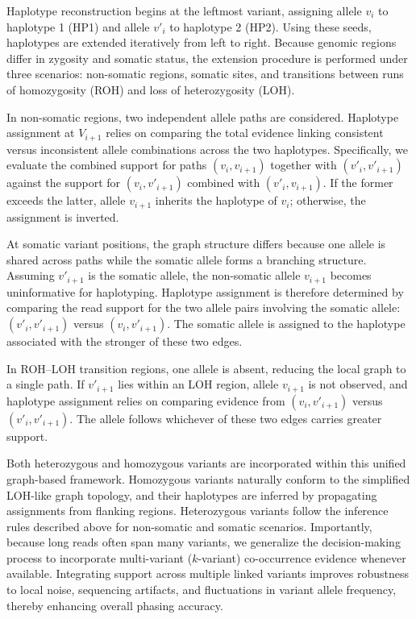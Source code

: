 \documentclass[pdflatex,sn-nature]{sn-jnl}
\begin{document}
Haplotype reconstruction begins at the leftmost variant, assigning allele \(v_i\) to haplotype 1 (HP1) and allele \(v'_i\) to haplotype 2 (HP2). Using these seeds, haplotypes are extended iteratively from left to right. Because genomic regions differ in zygosity and somatic status, the extension procedure is performed under three scenarios: non-somatic regions, somatic sites, and transitions between runs of homozygosity (ROH) and loss of heterozygosity (LOH).

In non-somatic regions, two independent allele paths are considered. Haplotype assignment at \(V_{i+1}\) relies on comparing the total evidence linking consistent versus inconsistent allele combinations across the two haplotypes. Specifically, we evaluate the combined support for paths \((v_i, v_{i+1})\) together with \((v'_i, v'_{i+1})\) against the support for \((v_i, v'_{i+1})\) combined with \((v'_i, v_{i+1})\). If the former exceeds the latter, allele \(v_{i+1}\) inherits the haplotype of \(v_i\); otherwise, the assignment is inverted.

At somatic variant positions, the graph structure differs because one allele is shared across paths while the somatic allele forms a branching structure. Assuming \(v'_{i+1}\) is the somatic allele, the non-somatic allele \(v_{i+1}\) becomes uninformative for haplotyping. Haplotype assignment is therefore determined by comparing the read support for the two allele pairs involving the somatic allele: \((v'_i, v'_{i+1})\) versus \((v_i, v'_{i+1})\). The somatic allele is assigned to the haplotype associated with the stronger of these two edges.

In ROH--LOH transition regions, one allele is absent, reducing the local graph to a single path. If \(v'_{i+1}\) lies within an LOH region, allele \(v_{i+1}\) is not observed, and haplotype assignment relies on comparing evidence from \((v_i, v'_{i+1})\) versus \((v'_i, v'_{i+1})\). The allele follows whichever of these two edges carries greater support.

Both heterozygous and homozygous variants are incorporated within this unified graph-based framework. Homozygous variants naturally conform to the simplified LOH-like graph topology, and their haplotypes are inferred by propagating assignments from flanking regions. Heterozygous variants follow the inference rules described above for non-somatic and somatic scenarios. Importantly, because long reads often span many variants, we generalize the decision-making process to incorporate multi-variant (\(k\)-variant) co-occurrence evidence whenever available. Integrating support across multiple linked variants improves robustness to local noise, sequencing artifacts, and fluctuations in variant allele frequency, thereby enhancing overall phasing accuracy.
\end{document}
